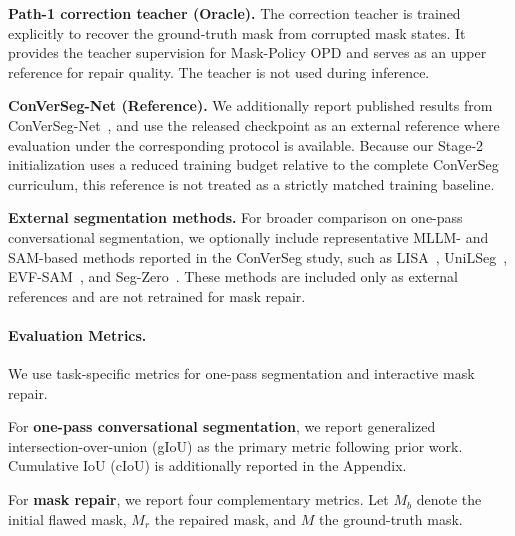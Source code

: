 \noindent\textbf{Path-1 correction teacher (Oracle).}
The correction teacher is trained explicitly to recover the ground-truth mask from corrupted mask states.
It provides the teacher supervision for Mask-Policy OPD and serves as an upper reference for repair quality.
The teacher is not used during inference.

\noindent\textbf{ConVerSeg-Net (Reference).}
We additionally report published results from ConVerSeg-Net~\cite{sahoo2026convseg}, and use the released checkpoint as an external reference where evaluation under the corresponding protocol is available.
Because our Stage-2 initialization uses a reduced training budget relative to the complete ConVerSeg curriculum, this reference is not treated as a strictly matched training baseline.

\noindent\textbf{External segmentation methods.}
For broader comparison on one-pass conversational segmentation, we optionally include representative MLLM- and SAM-based methods reported in the ConVerSeg study, such as LISA~\cite{lai2024lisa}, UniLSeg~\cite{unilseg}, EVF-SAM~\cite{evfsam}, and Seg-Zero~\cite{segzero}.
These methods are included only as external references and are not retrained for mask repair.


\paragraph{Evaluation Metrics.}
We use task-specific metrics for one-pass segmentation and interactive mask repair.

For \textbf{one-pass conversational segmentation}, we report generalized intersection-over-union (gIoU) as the primary metric following prior work.
Cumulative IoU (cIoU) is additionally reported in the Appendix.

For \textbf{mask repair}, we report four complementary metrics.
Let $M_b$ denote the initial flawed mask, $M_r$ the repaired mask, and $M$ the ground-truth mask.

